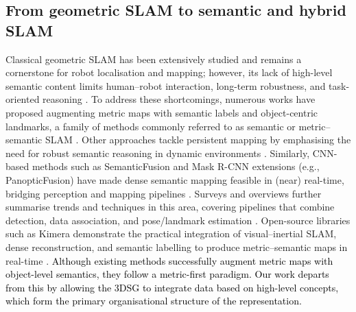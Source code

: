 \documentclass[10pt,a4paper]{article}
\begin{document}
\subsection{From geometric SLAM to semantic and hybrid SLAM}
Classical geometric SLAM has been extensively studied and remains a cornerstone for robot localisation and mapping; however, its lack of high-level semantic content limits human–robot interaction, long-term robustness, and task-oriented reasoning \cite{Cadena2016survey, orb_slam}. To address these shortcomings, numerous works have proposed augmenting metric maps with semantic labels and object-centric landmarks, a family of methods commonly referred to as semantic or metric–semantic SLAM \cite{salas2013slam, bowman2017probabilistic, mccormac2017semanticfusion}. Other approaches tackle persistent mapping by emphasising the need for robust semantic reasoning in dynamic environments \cite{narayana2020lifelongupdatesemanticmaps, santos2017spatio}. Similarly, CNN-based methods such as SemanticFusion \cite{mccormac2017semanticfusion} and Mask R-CNN extensions (e.g., PanopticFusion) \cite{he2017mask, narita2019panopticfusiononlinevolumetricsemantic} have made dense semantic mapping feasible in (near) real-time, bridging perception and mapping pipelines \cite{CNNsurvey}. Surveys and overviews further summarise trends and techniques in this area, covering pipelines that combine detection, data association, and pose/landmark estimation \cite{semanticslam2022, semanticslam2020}. Open-source libraries such as Kimera demonstrate the practical integration of visual–inertial SLAM, dense reconstruction, and semantic labelling to produce metric–semantic maps in real-time \cite{rosinol20203ddynamicscenegraphs}. \textcolor{black}{Although existing methods successfully augment metric maps with object-level semantics, they follow a metric-first paradigm. Our work departs from this by allowing the 3DSG to integrate data based on high-level concepts, which form the primary organisational structure of the representation.}
\end{document}
